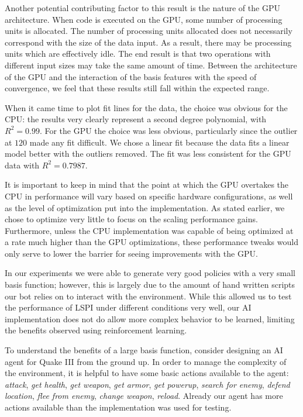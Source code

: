 Another potential contributing factor to this result is the nature of the GPU architecture. When code is executed on the GPU, some number of processing units is allocated. The number of processing units allocated does not necessarily correspond with the size of the data input. As a result, there may be processing units which are effectively idle. The end result is that two operations with different input sizes may take the same amount of time. Between the architecture of the GPU and the interaction of the basis features with the speed of convergence, we feel that these results still fall within the expected range.

When it came time to plot fit lines for the data, the choice was obvious for the CPU: the results very clearly represent a second degree polynomial, with $R^2 = 0.99$. For the GPU the choice was less obvious, particularly since the outlier at $120$ made any fit difficult. We chose a linear fit because the data fits a linear model better with the outliers removed. The fit was less consistent for the GPU data with $R^2 = 0.7987$.

It is important to keep in mind that the point at which the GPU overtakes the CPU in performance will vary based on specific hardware configurations, as well as the level of optimization put into the implementation. As stated earlier, we chose to optimize very little to focus on the scaling performance gains. Furthermore, unless the CPU implementation was capable of being optimized at a rate much higher than the GPU optimizations, these performance tweaks would only serve to lower the barrier for seeing improvements with the GPU.

In our experiments we were able to generate very good policies with a very small basis function; however, this is largely due to the amount of hand written scripts our bot relies on to interact with the environment. While this allowed us to test the performance of LSPI under different conditions very well, our AI implementation does not do allow more complex behavior to be learned, limiting the benefits observed using reinforcement learning.

To understand the benefits of a large basis function, consider designing an AI agent for Quake III from the ground up. In order to manage the complexity of the environment, it is helpful to have some basic actions available to the agent: \emph{attack}, \emph{get health}, \emph{get weapon}, \emph{get armor}, \emph{get powerup}, \emph{search for enemy}, \emph{defend location}, \emph{flee from enemy}, \emph{change weapon}, \emph{reload}. Already our agent has more actions available than the implementation was used for testing.

